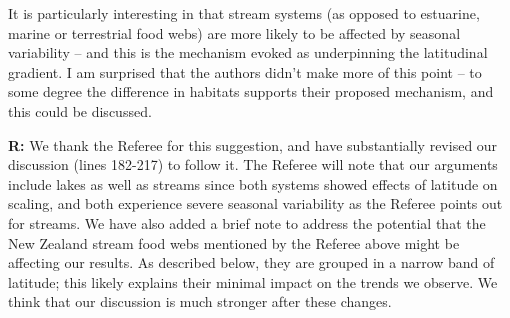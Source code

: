 \documentclass[12pt]{letter}
\newenvironment{refquote}{\bigskip \begin{it}}{\end{it}\smallskip}
\begin{document}
  \begin{refquote}

    It is particularly interesting in that stream systems (as opposed to
    estuarine, marine or terrestrial food webs) are more likely to be affected
    by seasonal variability – and this is the mechanism evoked as underpinning
    the latitudinal gradient. I am surprised that the authors didn’t make more
    of this point – to some degree the difference in habitats supports their
    proposed mechanism, and this could be discussed.

  \end{refquote}


  \textbf{R:} We thank the Referee for this suggestion, 
  and have substantially revised our discussion (lines 
  182-217) to follow it. The Referee will note that our 
  arguments include lakes as well as streams since both 
  systems showed effects of latitude on scaling, and both 
  experience severe seasonal variability as the Referee
  points out for streams. We have also added a brief note 
  to address the potential that the New Zealand stream food 
  webs mentioned by the Referee above might be affecting 
  our results. As described below, they are grouped in a 
  narrow band of latitude; this likely explains their 
  minimal impact on the trends we observe. We think that 
  our discussion is much stronger after these changes.
\end{document}

